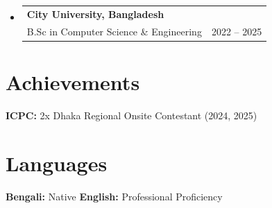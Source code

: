 \documentclass[letterpaper,10.5pt]{article}
\makeatletter
\newcommand{\resumeSubSubheading}[4]{
  \vspace{-2pt}\item
    \begin{tabular*}{0.97\textwidth}[t]{l@{\extracolsep{\fill}}r}
      \textbf{#1} & #2 \\[7pt]
      \small#3 & \small #4 \\
    \end{tabular*}\vspace{-2pt}
}
\newcommand{\resumeSubHeadingListStart}{\begin{itemize}[leftmargin=0.15in, label={}]}
\newcommand{\resumeSubHeadingListEnd}{\end{itemize}}
\makeatother
\begin{document}
\resumeSubHeadingListStart

\resumeSubSubheading
{City University, Bangladesh}{}
{B.Sc in Computer Science \& Engineering}{2022 -- 2025}

\resumeSubHeadingListEnd


\section{Achievements}

\vspace{4pt}

\begin{itemize}[leftmargin=0.15in, label={}]
\small{\item{

\textbf{ICPC:}{ 2x Dhaka Regional Onsite Contestant (2024, 2025)} \\[2pt]

}}
\end{itemize}


\section{Languages}

\vspace{4pt}

\begin{itemize}[leftmargin=0.15in, label={}]
\small{\item{

\textbf{Bengali:}{ Native} \quad\quad
\textbf{English:}{ Professional Proficiency}

}}
\end{itemize}

\end{document}
